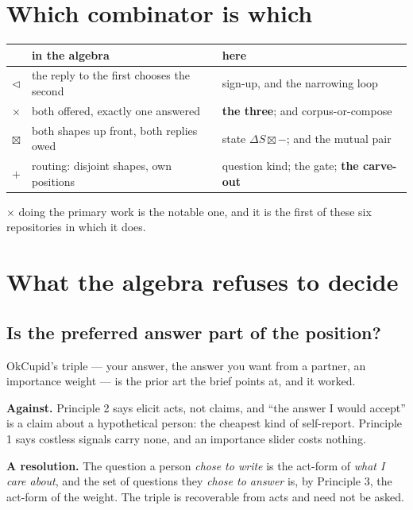 \documentclass[11pt,a4paper]{article}
\newcommand{\seq}{\mathbin{\triangleleft}}
\newcommand{\ten}{\mathbin{\boxtimes}}
\begin{document}
\section{Which combinator is which}

\begin{center}
\begin{tabular}{@{}cll@{}}
\toprule
& in the algebra & here \\
\midrule
$\seq$ & the reply to the first chooses the second
  & sign-up, and the narrowing loop \\
$\times$ & both offered, exactly one answered
  & \textbf{the three}; and corpus-or-compose \\
$\ten$ & both shapes up front, both replies owed
  & state $\Delta S \ten -$; and the mutual pair \\
$+$ & routing: disjoint shapes, own positions
  & question kind; the gate; \textbf{the carve-out} \\
\bottomrule
\end{tabular}
\end{center}

$\times$ doing the primary work is the notable one, and it is the first of these
six repositories in which it does.

\section{What the algebra refuses to decide}

\subsection{Is the preferred answer part of the position?}

OkCupid's triple --- your answer, the answer you want from a partner, an
importance weight --- is the prior art the brief points at, and it worked.

\textbf{Against.} Principle 2 says elicit acts, not claims, and ``the answer I
would accept'' is a claim about a hypothetical person: the cheapest kind of
self-report. Principle 1 says costless signals carry none, and an importance
slider costs nothing.

\textbf{A resolution.} The question a person \emph{chose to write} is the
act-form of \emph{what I care about}, and the set of questions they \emph{chose
to answer} is, by Principle 3, the act-form of the weight. The triple is
recoverable from acts and need not be asked.
\end{document}
